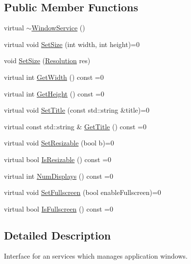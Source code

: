 \subsection*{Public Member Functions}
\begin{DoxyCompactItemize}
\item 
virtual \hyperlink{classastu_1_1WindowService_afa84180c2149454f5062608b468e7b51}{$\sim$\+Window\+Service} ()
\item 
virtual void \hyperlink{classastu_1_1WindowService_a77fb8b7272b58e39c7d003923034eedf}{Set\+Size} (int width, int height)=0
\item 
void \hyperlink{classastu_1_1WindowService_a344f90996e33b7861aa8870860ddd38f}{Set\+Size} (\hyperlink{group__srv__group_ga68a91c7015964dbdea802829ae5ccb3c}{Resolution} res)
\item 
virtual int \hyperlink{classastu_1_1WindowService_ad2e75e91b0d72afb92c980fcbd8f227a}{Get\+Width} () const =0
\item 
virtual int \hyperlink{classastu_1_1WindowService_a16d1880606a2c597162d8c80bed9d1a2}{Get\+Height} () const =0
\item 
virtual void \hyperlink{classastu_1_1WindowService_a298dcaad372f611f14edb4ad33044efd}{Set\+Title} (const std\+::string \&title)=0
\item 
virtual const std\+::string \& \hyperlink{classastu_1_1WindowService_a54815692f9d3086673dd2694d75dcb65}{Get\+Title} () const =0
\item 
virtual void \hyperlink{classastu_1_1WindowService_a78bee95831f4497fcee7b8d10575f0d8}{Set\+Resizable} (bool b)=0
\item 
virtual bool \hyperlink{classastu_1_1WindowService_a277954f71dd019b3ffc5d37df3f8b3af}{Is\+Resizable} () const =0
\item 
virtual int \hyperlink{classastu_1_1WindowService_ad773e0c567946e06ace76c016bb16349}{Num\+Displays} () const =0
\item 
virtual void \hyperlink{classastu_1_1WindowService_abe2ef0eb9f42078676318945e15d2dce}{Set\+Fullscreen} (bool enable\+Fullscreen)=0
\item 
virtual bool \hyperlink{classastu_1_1WindowService_aa94ce60d1e8dd7484d364b65c25be1ca}{Is\+Fullscreen} () const =0
\end{DoxyCompactItemize}


\subsection{Detailed Description}
Interface for an services which manages application windows. 

